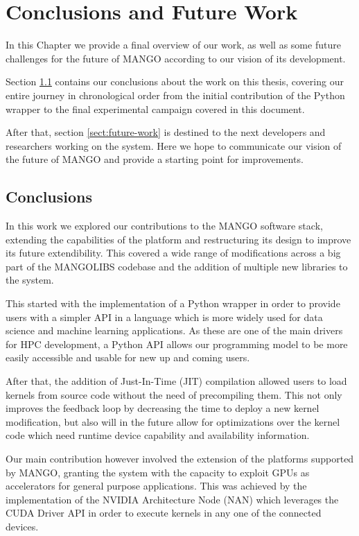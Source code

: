 \chapter{Conclusions and Future Work} \label{ch:Conclusions}

In this Chapter we provide a final overview of our work, as well as some future challenges for the future of MANGO according to our vision of its development.

Section \ref{sect:conclusions} contains our conclusions about the work on this thesis, covering our entire journey in chronological order from the initial contribution of the Python wrapper to the final experimental campaign covered in this document.

After that, section \ref{sect:future-work} is destined to the next developers and researchers working on the system. Here we hope to communicate our vision of the future of MANGO and provide a starting point for improvements. 

\section{Conclusions} \label{sect:conclusions}

In this work we explored our contributions to the MANGO software stack, extending the capabilities of the platform and restructuring its design to improve its future extendibility. This covered a wide range of modifications across a big part of the MANGOLIBS codebase and the addition of multiple new libraries to the system.

This started with the implementation of a Python wrapper in order to provide users with a simpler API in a language which is more widely used for data science and machine learning applications. As these are one of the main drivers for HPC development, a Python API allows our programming model to be more easily accessible and usable for new up and coming users.

After that, the addition of Just-In-Time (JIT) compilation allowed users to load kernels from source code without the need of precompiling them. This not only improves the feedback loop by decreasing the time to deploy a new kernel modification, but also will in the future allow for optimizations over the kernel code which need runtime device capability and availability information.

Our main contribution however involved the extension of the platforms supported by MANGO, granting the system with the capacity to exploit GPUs as accelerators for general purpose applications. This was achieved by the implementation of the NVIDIA Architecture Node (NAN) which leverages the CUDA Driver API in order to execute kernels in any one of the connected devices. 

